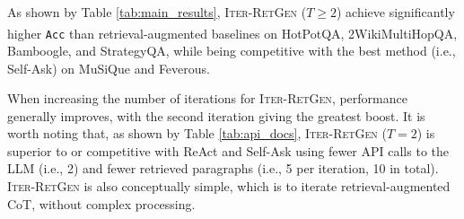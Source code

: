 \documentclass[11pt]{article}
\begin{document}
\begingroup
\setlength{\tabcolsep}{3pt} %
\renewcommand{\arraystretch}{1} %
\begin{table}[t!]
    \centering
    \caption{
    Average numbers of API calls to \texttt{text-davinci-003} and retrieved paragraphs for ReAct and Self-Ask.
    Note that I\textsc{ter}-R\textsc{et}G\textsc{en} ($T=2$) achieves significantly higher or competitive \texttt{Acc\textsuperscript{\dag}} with fewer API calls (i.e., 2) and fewer retrieved paragraphs (5 per iteration, 10 in total).
    }
    \label{tab:api_docs}
\end{table}
\endgroup

As shown by Table \ref{tab:main_results}, I\textsc{ter}-R\textsc{et}G\textsc{en} ($T \ge 2$) achieve significantly higher \texttt{Acc\textsuperscript{\dag}} than retrieval-augmented baselines on HotPotQA, 2WikiMultiHopQA, Bamboogle, and StrategyQA, while being competitive with the best method (i.e., Self-Ask) on MuSiQue and Feverous.

When increasing the number of iterations for I\textsc{ter}-R\textsc{et}G\textsc{en}, performance generally improves, with the second iteration giving the greatest boost.
It is worth noting that, as shown by Table \ref{tab:api_docs}, I\textsc{ter}-R\textsc{et}G\textsc{en} ($T=2$) is superior to or competitive with ReAct and Self-Ask using fewer API calls to the LLM (i.e., 2) and fewer retrieved paragraphs (i.e., 5 per iteration, 10 in total).
I\textsc{ter}-R\textsc{et}G\textsc{en} is also conceptually simple, which is to iterate retrieval-augmented CoT, without complex processing.
\end{document}
